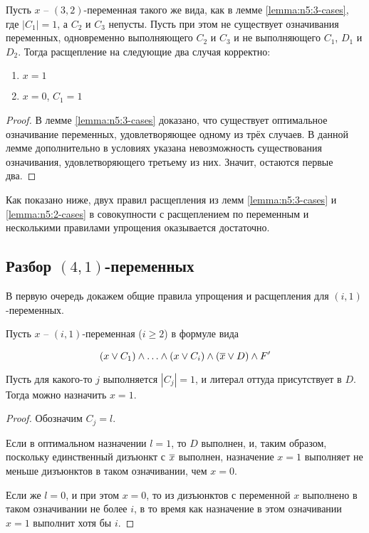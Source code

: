 \begin{lemma}
 Пусть $x$ -- $(3,2)$-переменная такого же вида, как в лемме \ref{lemma:n5:3-cases}, где $|C_1| = 1$, а $C_2$ и $C_3$ непусты. Пусть при этом не существует означивания переменных, одновременно выполняющего $C_2$ и $C_3$ и не выполняющего $C_1$, $D_1$ и $D_2$. Тогда расщепление на следующие два случая корректно:

 \begin{enumerate}
  \item $x = 1$
  \item $x = 0$, $C_1 = 1$
 \end{enumerate}
 \label{lemma:n5:2-cases}
\end{lemma}

\begin{proof}
 В лемме \ref{lemma:n5:3-cases} доказано, что существует оптимальное означивание переменных, удовлетворяющее одному из трёх случаев. В данной лемме дополнительно в условиях указана невозможность существования означивания, удовлетворяющего третьему из них. Значит, остаются первые два.
\end{proof}

Как показано ниже, двух правил расщепления из лемм \ref{lemma:n5:3-cases} и \ref{lemma:n5:2-cases} в совокупности с расщеплением по переменным и несколькими правилами упрощения оказывается достаточно.

\subsection{Разбор $(4,1)$-переменных}
\label{subsec:n5:41}

\firstpar{}В первую очередь докажем общие правила упрощения и расщепления для $(i,1)$-переменных.

\begin{rrule}
 Пусть $x$ -- $(i,1)$-переменная ($i \geq 2$) в формуле вида

 $$
  (x \vee C_1) \wedge \ldots \wedge (x \vee C_i) \wedge (\overline{x} \vee D) \wedge F'
 $$

 Пусть для какого-то $j$ выполняется $|C_j| = 1$, и литерал оттуда присутствует в $D$. Тогда можно назначить $x = 1$.
 \label{rrule:n5:i1}
\end{rrule}

\begin{proof}
 Обозначим $C_j = l$.

 Если в оптимальном назначении $l = 1$, то $D$ выполнен, и, таким образом, поскольку единственный дизъюнкт с $\overline{x}$ выполнен, назначение $x = 1$ выполняет не меньше дизъюнктов в таком означивании, чем $x = 0$.

 Если же $l = 0$, и при этом $x = 0$, то из дизъюнктов с переменной $x$ выполнено в таком означивании не более $i$, в то время как назначение в этом означивании $x = 1$ выполнит хотя бы $i$.
\end{proof}

